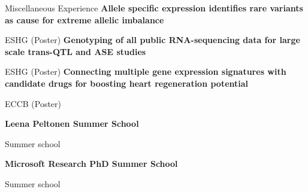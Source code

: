 \begin{rubric}{Miscellaneous Experience}
\entry*[17 June 2018] \textbf{Allele specific expression identifies rare variants as cause for extreme allelic imbalance} \par
ESHG (Poster)
%
\entry*[25 May 2016] \textbf{Genotyping of all public RNA-sequencing data for large scale trans-QTL and ASE studies} \par
ESHG (Poster)
%
\entry*[8 Sep 2014] \textbf{Connecting multiple gene expression signatures with candidate drugs for boosting heart regeneration potential} \par
ECCB (Poster)

\entry*[Aug 2018] \textbf{Leena Peltonen Summer School} \par
Summer school

\entry*[Jul 2016] \textbf{Microsoft Research PhD Summer School} \par
Summer school

\end{rubric}